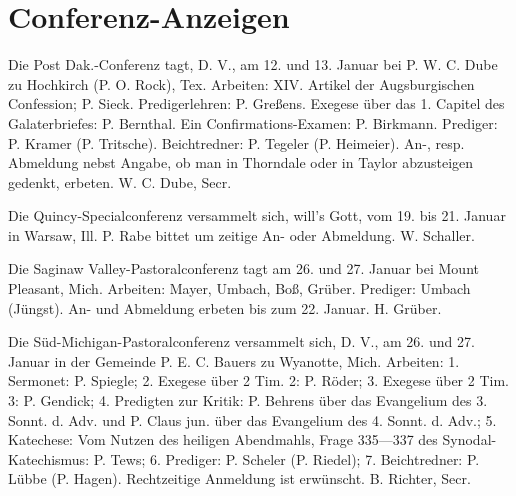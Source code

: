 \chapter[Conferenz-Anzeigen]{Conferenz-Anzeigen}
Die Post Dak.-Conferenz tagt, D. V., am 12. und 13. Januar bei P. W. C. Dube zu Hochkirch (P. O. Rock), Tex. Arbeiten: XIV. Artikel der Augsburgischen Confession; P. Sieck. Predigerlehren: P. Greßens. Exegese über das 1. Capitel des Galaterbriefes: P. Bernthal. Ein Confirmations-Examen: P. Birkmann. Prediger: P. Kramer (P. Tritsche). Beichtredner: P. Tegeler (P. Heimeier). An-, resp. Abmeldung nebst Angabe, ob man in Thorndale oder in Taylor abzusteigen gedenkt, erbeten. W. C. Dube, Secr.

Die Quincy-Specialconferenz versammelt sich, will’s Gott, vom 19. bis 21. Januar in Warsaw, Ill. P. Rabe bittet um zeitige An- oder Abmeldung. W. Schaller.

Die Saginaw Valley-Pastoralconferenz tagt am 26. und 27. Januar bei Mount Pleasant, Mich. Arbeiten: Mayer, Umbach, Boß, Grüber. Prediger: Umbach (Jüngst). An- und Abmeldung erbeten bis zum 22. Januar. H. Grüber.

Die Süd-Michigan-Pastoralconferenz versammelt sich, D. V., am 26. und 27. Januar in der Gemeinde P. E. C. Bauers zu Wyanotte, Mich. Arbeiten: 1. Sermonet: P. Spiegle; 2. Exegese über 2 Tim. 2: P. Röder; 3. Exegese über 2 Tim. 3: P. Gendick; 4. Predigten zur Kritik: P. Behrens über das Evangelium des 3. Sonnt. d. Adv. und P. Claus jun. über das Evangelium des 4. Sonnt. d. Adv.; 5. Katechese: Vom Nutzen des heiligen Abendmahls, Frage 335—337 des Synodal-Katechismus: P. Tews; 6. Prediger: P. Scheler (P. Riedel); 7. Beichtredner: P. Lübbe (P. Hagen). Rechtzeitige Anmeldung ist erwünscht. B. Richter, Secr.
